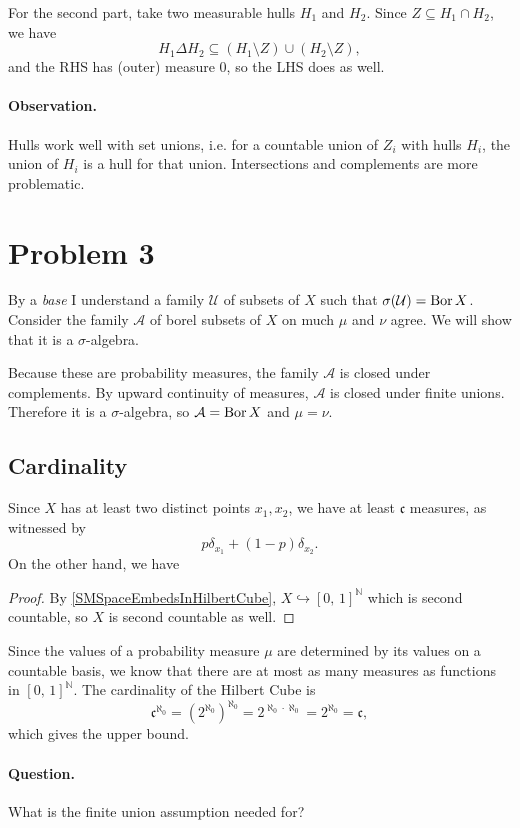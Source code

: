 For the second part, take two measurable hulls \( H_1 \) and \( H_2 \). Since \( Z \subseteq H_1 \cap H_2 \), we have
\[ 
    H_1 \Delta H_2 \subseteq (H_1 \setminus Z) \cup (H_2 \setminus Z),
\]
and the RHS has (outer) measure \( 0 \), so the LHS does as well.

\paragraph{Observation.} Hulls work well with set unions, i.e. for a countable union of \( Z_i \) with hulls \( H_i \), the union of \( H_i \) is a hull for that union. Intersections and complements are more problematic.

\section*{Problem 3}

By a \emph{base} I understand a family \( \mathcal{U} \) of subsets of \( X \) such that \( \sigma( \mathcal{U} ) = \operatorname{Bor} X \). Consider the family \( \mathcal{A} \) of borel subsets of \( X \) on much \( \mu \) and \( \nu \) agree. We will show that it is a \( \sigma \)-algebra.

Because these are probability measures, the family \( \mathcal{A} \) is closed under complements. By upward continuity of measures, \( \mathcal{A} \) is closed under finite unions. Therefore it is a \( \sigma \)-algebra, so \( \mathcal{A} = \operatorname{Bor} X \) and \( \mu = \nu \).

\subsection*{Cardinality}

Since \( X \) has at least two distinct points \( x_1, x_2 \), we have at least \( \mathfrak{c} \) measures, as witnessed by
\[ 
    p\delta_{x_1} + (1-p)\delta_{x_2}. 
\]
On the other hand, we have

\begin{proof}
    By \ref{SMSpaceEmbedsInHilbertCube}, \( X \hookrightarrow [0,\,1]^{ \mathbb{N} } \) which is second countable, so \( X \) is second countable as well. 
\end{proof}

Since the values of a probability measure \( \mu \) are determined by its values on a countable basis, we know that there are at most as many measures as functions in \( [0,\,1]^{ \mathbb{N} } \). The cardinality of the Hilbert Cube is
\[ 
    \mathfrak{c}^{\aleph_0} = \left( 2^{\aleph_0} \right)^{\aleph_0} = 2^{\aleph_0 \cdot \aleph_0} = 2^{\aleph_0} = \mathfrak{c}, 
\]
which gives the upper bound.

\paragraph{Question.} What is the finite union assumption needed for?
